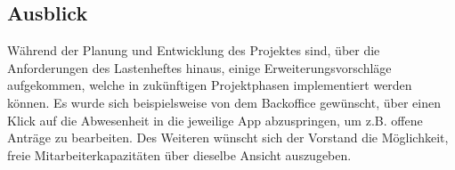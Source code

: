 \subsection{Ausblick}
\label{sec:Ausblick}
Während der Planung und Entwicklung des Projektes sind, über die Anforderungen des Lastenheftes hinaus, einige Erweiterungsvorschläge aufgekommen, welche in zukünftigen Projektphasen implementiert werden können. Es wurde sich beispielsweise von dem Backoffice gewünscht, über einen Klick auf die Abwesenheit in die jeweilige App abzuspringen, um z.B. offene Anträge zu bearbeiten. Des Weiteren wünscht sich der Vorstand die Möglichkeit, freie Mitarbeiterkapazitäten über dieselbe Ansicht auszugeben.
